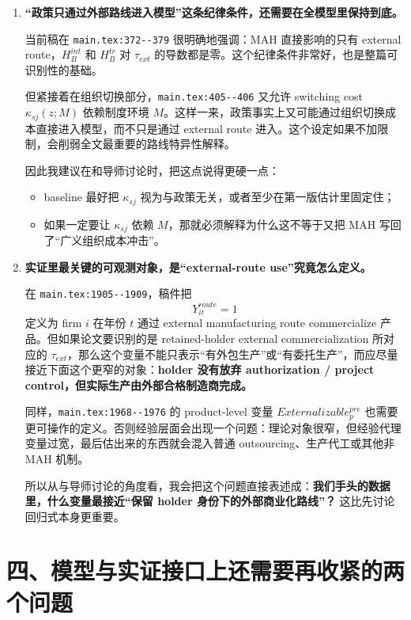 \documentclass[12pt]{ctexart}
\newcommand{\fileref}[1]{\nolinkurl{#1}}
\begin{document}
\begin{enumerate}
在我看来，这是当前模型里第二个最需要尽快钉住的接口。

\item \textbf{“政策只通过外部路线进入模型”这条纪律条件，还需要在全模型里保持到底。}

当前稿在 \fileref{main.tex:372--379} 很明确地强调：MAH 直接影响的只有 external route，$H_B^{int}$ 和 $H_B^{tr}$ 对 $\tau_{ext}$ 的导数都是零。这个纪律条件非常好，也是整篇可识别性的基础。

但紧接着在组织切换部分，\fileref{main.tex:405--406} 又允许 switching cost $\kappa_{sj}(z;M)$ 依赖制度环境 $M$。这样一来，政策事实上又可能通过组织切换成本直接进入模型，而不只是通过 external route 进入。这个设定如果不加限制，会削弱全文最重要的路线特异性解释。

因此我建议在和导师讨论时，把这点说得更硬一点：
\begin{itemize}
\item baseline 最好把 $\kappa_{sj}$ 视为与政策无关，或者至少在第一版估计里固定住；
\item 如果一定要让 $\kappa_{sj}$ 依赖 $M$，那就必须解释为什么这不等于又把 MAH 写回了“广义组织成本冲击”。
\end{itemize}

\item \textbf{实证里最关键的可观测对象，是“external-route use”究竟怎么定义。}

在 \fileref{main.tex:1905--1909}，稿件把
\[
Y_{it}^{route}=1
\]
定义为 firm $i$ 在年份 $t$ 通过 external manufacturing route commercialize 产品。但如果论文要识别的是 retained-holder external commercialization 所对应的 $\tau_{ext}$，那么这个变量不能只表示“有外包生产”或“有委托生产”，而应尽量接近下面这个更窄的对象：\textbf{holder 没有放弃 authorization / project control，但实际生产由外部合格制造商完成。}

同样，\fileref{main.tex:1968--1976} 的 product-level 变量 $Externalizable_p^{pre}$ 也需要更可操作的定义。否则经验层面会出现一个问题：理论对象很窄，但经验代理变量过宽，最后估出来的东西就会混入普通 outsourcing、生产代工或其他非 MAH 机制。

所以从与导师讨论的角度看，我会把这个问题直接表述成：\textbf{我们手头的数据里，什么变量最接近“保留 holder 身份下的外部商业化路线”？} 这比先讨论回归式本身更重要。
\end{enumerate}

\section*{四、模型与实证接口上还需要再收紧的两个问题}
\end{document}
